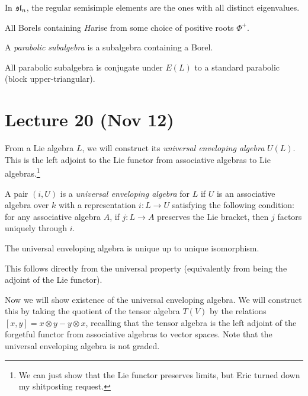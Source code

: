 \documentclass[twoside, 10pt]{article}
\begin{document}
    \begin{exm} In $\mathfrak{sl}_n$, the regular semisimple elements are the ones
    with all distinct eigenvalues.  \end{exm}

    \begin{cor} All Borels containing $H$arise from some choice of positive
    roots $\Phi^+$.  \end{cor}

    \begin{defn} A \textit{parabolic subalgebra} is a subalgebra containing a
    Borel.  \end{defn}

    \begin{thm} All parabolic subalgebra is conjugate under $E(L)$ to a
    standard parabolic (block upper-triangular).  \end{thm}

    \section{Lecture 20 (Nov 12)}%
    
    From a Lie algebra $L$, we will construct its \textit{universal enveloping
    algebra} $U(L)$. This is the left adjoint to the Lie functor from
    associative algebras to Lie algebras.\footnote{We can just show that the
    Lie functor preserves limits, but Eric turned down my shitposting request.}

    \begin{defn} A pair $(i,U)$ is a \textit{universal enveloping algebra} for
        $L$ if $U$ is an associative algebra over $k$ with a representation
        $i:L \to U$ satisfying the following condition: for any associative
        algebra $A$, if $j: L \to A$ preserves the Lie bracket, then $j$
        factors uniquely through $i$.  \end{defn}

    \begin{prop} The universal enveloping algebra is unique up to unique
    isomorphism.  \end{prop}

    This follows directly from the universal property (equivalently from being
    the adjoint of the Lie functor).

    Now we will show existence of the universal enveloping algebra. We will
    construct this by taking the quotient of the tensor algebra $T(V)$ by the
    relations $[x,y] = x \otimes y - y \otimes x$, recalling that the tensor
    algebra is the left adjoint of the forgetful functor from associative
    algebras to vector spaces. Note that the universal enveloping algebra is
    not graded.
\end{document}
